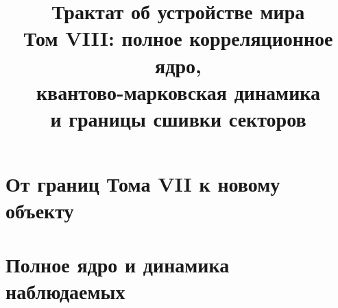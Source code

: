 \documentclass[12pt,a4paper]{report}
\title{Трактат об устройстве мира\\
Том VIII: полное корреляционное ядро,\\
квантово-марковская динамика\\
и границы сшивки секторов}
\author{}
\date{}
\theoremstyle{remark}
\begin{document}
\hypersetup{pageanchor=false}
\maketitle
\clearpage
\hypersetup{pageanchor=true}
\setcounter{page}{1}
\tableofcontents
\clearpage
{}

\part{От границ Тома VII к новому объекту}









\part{Полное ядро и динамика наблюдаемых}




























\end{document}
